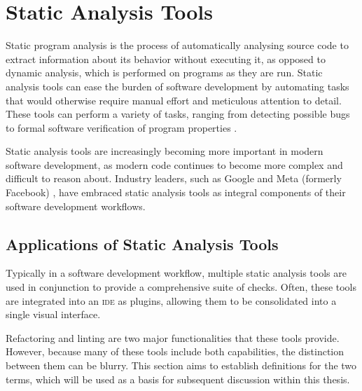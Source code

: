 \chapter{Static Analysis Tools}


Static program analysis is the process of automatically analysing source code to extract information about its behavior without executing it, as opposed to dynamic analysis, which is performed on programs as they are run.
Static analysis tools can ease the burden of software development by automating tasks that would otherwise require manual effort and meticulous attention to detail.
These tools can perform a variety of tasks, ranging from detecting possible bugs \cite{johnson_lint_1978,hovemeyer_finding-bugs_2004} to formal software verification of program properties \cite{blanchet_static-analyzer_2003}.

Static analysis tools are increasingly becoming more important in modern software development, as modern code continues to become more complex and difficult to reason about.
Industry leaders, such as Google \cite{sadowski_analysis-google_2018} and Meta (formerly Facebook) \cite{calcagno_moving-facebook_2015}, have embraced static analysis tools as integral components of their software development workflows.

\section{Applications of Static Analysis Tools}
Typically in a software development workflow, multiple static analysis tools are used in conjunction to provide a comprehensive suite of checks.
Often, these tools are integrated into an \textsc{ide} as plugins, allowing them to be consolidated into a single visual interface.

Refactoring and linting are two major functionalities that these tools provide.
However, because many of these tools include both capabilities, the distinction between them can be blurry.
This section aims to establish definitions for the two terms, which will be used as a basis for subsequent discussion within this thesis.

